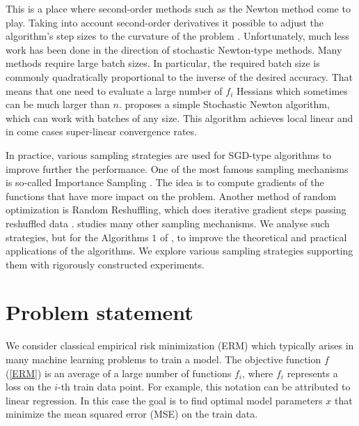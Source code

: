 \documentclass{article}
\theoremstyle{definition}
\theoremstyle{assumption}
\theoremstyle{lemma}
\theoremstyle{theorem}
\theoremstyle{proposition}
\begin{document}
	This is a place where second-order methods such as the Newton method \cite{Nesterov-introductory, Newton-convergence, RSN} come to play. Taking into account second-order derivatives it possible to adjust the algorithm's step sizes to the curvature of the problem \cite{Nesterov-introductory}. Unfortunately, much less work has been done in the direction of stochastic Newton-type methods. Many methods \cite{sub-sampled, exact-inexact, variance-reduced-Newton, zhang2022adaptive, tripuraneni2018stochastic, zhou2020stochastic} require large batch sizes. In particular, the required batch size is commonly quadratically proportional to the inverse of the desired accuracy. That means that one need to evaluate a large number of $f_i$ Hessians which sometimes can be much larger than $n$. \cite{kovalev2019stochastic} proposes a simple Stochastic Newton algorithm, which can work with batches of any size. This algorithm achieves local linear and in come cases super-linear convergence rates. 
	
	In practice, various sampling strategies are used for SGD-type algorithms to improve further the performance. One of the most famous sampling mechanisms is so-called Importance Sampling \cite{gower2019sgd, https://doi.org/10.48550/arxiv.1401.2753, 9413313}. The idea is to compute gradients of the functions that have more impact on the problem. Another method of random optimization is Random Reshuffling, which does iterative gradient steps passing reshuffled data \cite{mishchenko2020random}. \cite{richtarik2016parallel} studies many other sampling mechanisms. We analyse such strategies, but for the Algorithms $1$ of \cite{kovalev2019stochastic}, to improve the theoretical and practical applications of the algorithms. We explore various sampling strategies supporting them with  rigorously constructed experiments. 
	
\section{Problem statement}

	We consider classical empirical risk minimization (ERM) which typically arises in many machine learning problems to train a model. The objective function $f$ (\ref{ERM}) is an average of a large number of functions $f_i$, where $f_i$ represents a loss on the $i$-th train data point. For example, this notation can be attributed to linear regression. In this case the goal is to find optimal model parameters $x$ that minimize the mean squared error (MSE) on the train data.
	
\end{document}
